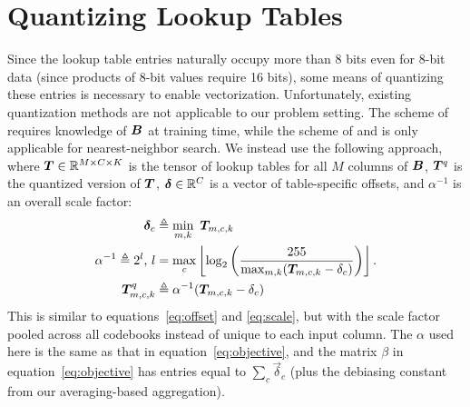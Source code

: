
\section{Quantizing Lookup Tables} \label{sec:lutQuantize}


Since the lookup table entries naturally occupy more than 8 bits even for 8-bit data (since products of 8-bit values require 16 bits), some means of quantizing these entries is necessary to enable vectorization. Unfortunately, existing quantization methods are not applicable to our problem setting. The scheme of \citet{bolt} requires knowledge of $\bm{B}$ at training time, while the scheme of \citet{quickAdc} and \citet{quickerAdc} is only applicable for nearest-neighbor search. We instead use the following approach, where $\bm{T} \in \mathbb{R}^{M \times C \times K}$ is the tensor of lookup tables for all $M$ columns of $\bm{B}$, $\bm{T}^q$ is the quantized version of $\bm{T}$, $\bm{\delta} \in \mathbb{R}^C$ is a vector of table-specific offsets, and $\alpha^{-1}$ is an overall scale factor:
\begin{align}
    \bm{\delta}_c &\triangleq \min_{m,k} \text{ } \bm{T}_{m,c,k} \\
    \alpha^{-1} \triangleq 2^l \text{, } l &= \max_c \left \lfloor  \log_2 \left( \frac{255}{
            \max_{m,k} (\bm{T}_{m,c,k} - \delta_{c})
        } \right) \right \rfloor. \\
    \bm{T}^q_{m,c,k} &\triangleq \alpha^{-1}(\bm{T}_{m,c,k} - \delta_{c})
\end{align}
This is similar to equations~\ref{eq:offset} and \ref{eq:scale}, but with the scale factor pooled across all codebooks instead of unique to each input column. The $\alpha$ used here is the same as that in equation~\ref{eq:objective}, and the matrix $\beta$ in equation~\ref{eq:objective} has entries equal to $\sum_c \vec{\delta}_c$ (plus the debiasing constant from our averaging-based aggregation).

